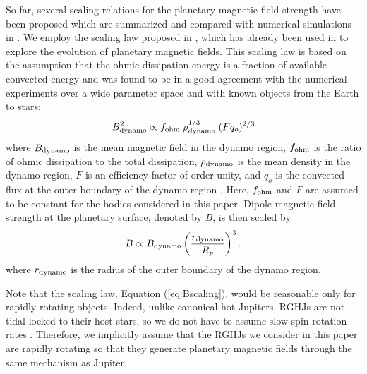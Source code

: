 \documentclass[iop,numberedappendix,apj]{emulateapj}
\def\memoYF#1{\color{red}$[${\bf #1}$]$ \color{black}}
\begin{document}
So far, several scaling relations for the planetary magnetic field strength  
have been proposed \citep[e.g.][]{russel1978,busse1976,stevenson1979,mizutani1992,sano1993,starchenko2002,christensen2006,christensen_et_al2009} %
which are summarized and compared with numerical simulations in \citet{christensen2010}. 
We employ the scaling law proposed in \citet{christensen_et_al2009}, which has already been used in \citet{reiners2010} to explore the evolution of planetary magnetic fields.
This scaling law is based on the assumption that the ohmic dissipation energy is a fraction of available convected energy and was found to be in a good agreement with the numerical experiments over a wide parameter space and with known objects from the Earth to stars: 
\begin{equation}
B_{\rm dynamo} ^2 \propto f_{\rm ohm}\;\rho_{\rm dynamo}  ^{1/3} \;  (Fq_o)^{2/3} \label{eq:Bscaling} 
\end{equation}
where $B_{\rm dynamo}$ is the mean magnetic field in the dynamo region, $f_{\rm ohm}$ is the ratio of ohmic dissipation to the total dissipation, $\rho_{\rm dynamo} $ is the mean density in the dynamo region, $F$ is an efficiency factor of order unity, and $q_o$ is the convected flux at the outer boundary of the dynamo region \citep[see][for the comprehensive description]{christensen_et_al2009}. 
Here, $f_{\rm ohm}$ and $F$ are assumed to be constant for the bodies considered in this paper. 
Dipole magnetic field strength at the planetary surface, denoted by $B$, is then scaled by
\begin{equation}
B \propto B_{\rm dynamo} \left( \frac{r_{\rm dynamo}}{R_p} \right)^3.  \label{eq:Bscaling2}
\end{equation}
where $r_{\rm dynamo}$ is the radius of the outer boundary of the dynamo region. 

Note that the scaling law, Equation (\ref{eq:Bscaling}), would be reasonable only for rapidly rotating objects.
Indeed, unlike canonical hot Jupiters, RGHJs are not tidal locked to their host stars, so we do not have to assume slow spin rotation rates \citep{spiegel+madhusudhan2012}.
Therefore, we implicitly assume that the RGHJs we consider in this paper are rapidly rotating so that they generate planetary magnetic fields through the same mechanism as Jupiter. 
\end{document}

